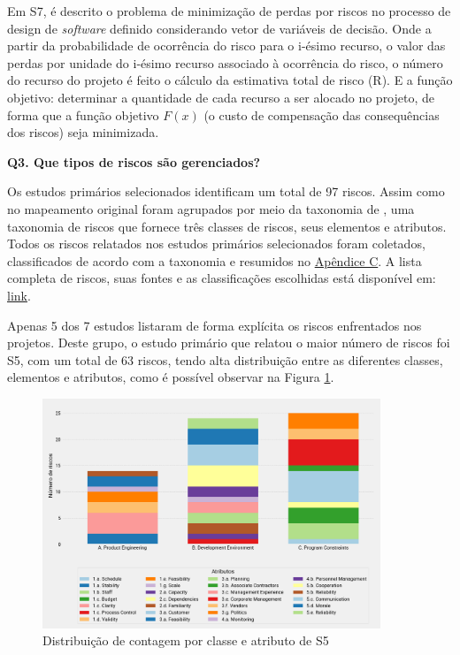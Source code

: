 \documentclass[
	12pt,
	openright,
	twoside,
	a4paper,
	english,
	brazil
	]{abntex2}
\begin{document}
Em S7, é descrito o problema de minimização de perdas por riscos no processo de design de \textit{software} definido considerando vetor de variáveis de decisão. Onde a partir da probabilidade de ocorrência do risco para o i-ésimo recurso, o valor das perdas por unidade do i-ésimo recurso associado à ocorrência do risco, o número do recurso do projeto é feito o cálculo da estimativa total de risco (R). E a função objetivo: determinar a quantidade de cada recurso a ser alocado no projeto, de forma que a função objetivo \(F(x)\) (o custo de compensação das consequências dos riscos) seja minimizada.

\textbf{Q3. Que tipos de riscos são gerenciados?}

Os estudos primários selecionados identificam um total de 97 riscos. Assim como no mapeamento original foram agrupados por meio da taxonomia de , uma taxonomia de riscos que fornece três classes de riscos, seus elementos e atributos. Todos os riscos relatados nos estudos primários selecionados foram coletados, classificados de acordo com a taxonomia e resumidos no \hyperref[apendiceC]{Apêndice C}. A lista completa de riscos, suas fontes e as classificações escolhidas está disponível em: \href{https://docs.google.com/spreadsheets/d/1YY_yjyBefJ3ZmnEY38TM_LnZLoJcKhrw_q0BdEvqx2E/edit?usp=drivesdk}{link}.

Apenas 5 dos 7 estudos listaram de forma explícita os riscos enfrentados nos projetos. Deste grupo, o estudo primário que relatou o maior número de riscos foi S5, com um total de 63 riscos, tendo alta distribuição entre as diferentes classes, elementos e atributos, como é possível observar na Figura \ref{dist-contagem-classe-atributo}.

\begin{figure}[H]
  \centering
	\caption{\label{dist-contagem-classe-atributo}Distribuição de contagem por classe e atributo de S5}
  \includegraphics[width=0.9\textwidth]{dist-contagem-classe-atributo}
\end{figure}
\end{document}
